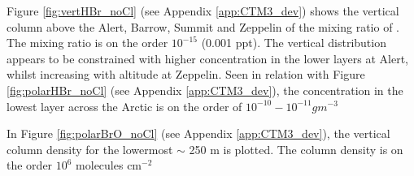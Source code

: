





\medskip

Figure \ref{fig:vertHBr_noCl} (see Appendix \ref{app:CTM3_dev}) shows the vertical column above the Alert, Barrow, Summit and Zeppelin of the mixing ratio of . The mixing ratio is on the order $10^{-15}$ (0.001 ppt). The vertical distribution appears to be constrained with higher concentration in the lower layers at Alert, whilst increasing with altitude at Zeppelin. Seen in relation with Figure \ref{fig:polarHBr_noCl} (see Appendix \ref{app:CTM3_dev}), the concentration in the lowest layer across the Arctic is on the order of $10^{-10} - 10^{-11} g m^{-3}$

\medskip

In Figure \ref{fig:polarBrO_noCl} (see Appendix \ref{app:CTM3_dev}), the vertical column density for the lowermost $\sim$ 250 m is plotted. The column density is on the order $10^{6}$ molecules cm$^{-2}$




%

%

%

%







